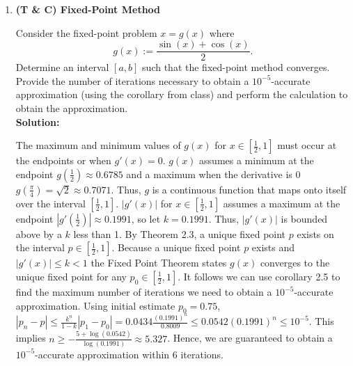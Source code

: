 \documentclass[10pt]{article}
\begin{document}
\begin{enumerate}[label=\bfseries Problem \arabic*:]

\vspace{1em}
\item \textbf{(T \& C) Fixed-Point Method}\par 
Consider the fixed-point problem $x=g(x)$ where $$g(x):=\frac{\sin(x)+\cos(x)}{2}.$$ Determine an interval $[a,b]$ such that the fixed-point method converges. Provide the number of iterations necessary to obtain a $10^{-5}$-accurate approximation (using the corollary from class) and perform the calculation to obtain the approximation.\\
\vspace{1em}
\textbf{Solution:}\par 
The maximum and minimum values of $g(x)$ for $x\in[\frac{1}{2},1]$ must occur at the endpoints or when $g'(x)=0$. 
$g(x)$ assumes a minimum at the endpoint $g(\frac{1}{2})\approx0.6785$ and a maximum when the derivative is 0 $g(\frac{\pi}{4})=\sqrt{2}\approx0.7071$.
Thus, $g$ is a continuous function that maps onto itself over the interval $[\frac{1}{2},1]$.
$|g'(x)|$ for $x\in[\frac{1}{2},1]$ assumes a maximum at the endpoint $|g'(\frac{1}{2})|\approx0.1991$, so let $k=0.1991$.
Thus, $|g'(x)|$ is bounded above by a $k$ less than 1.
By Theorem 2.3, a unique fixed point $p$ exists on the interval $p\in[\frac{1}{2},1]$.
Because a unique fixed point $p$ exists and $|g'(x)|\le k<1$ the Fixed Point Theorem states $g(x)$ converges to the unique fixed point for any $p_0\in[\frac{1}{2},1]$. 
It follows we can use corollary 2.5 to find the maximum number of iterations we need to obtain a $10^{-5}$-accurate approximation. 
Using initial estimate $p_0=0.75$, $|p_n-p|\le \frac{k^n}{1-k}|p_1-p_0|=0.0434\frac{(0.1991)^n}{0.8009}\le0.0542(0.1991)^n\le10^{-5}$.
This implies $n\ge -\frac{5+\log(0.0542)}{\log(0.1991)}\approx 5.327$.
Hence, we are guaranteed to obtain a $10^{-5}$-accurate approximation within 6 iterations. 
\begin{figure}[H]
    \centering
    \begin{minipage}{.5\textwidth}
        \centering

\end{minipage}
\end{figure}
\end{enumerate}
\end{document}

